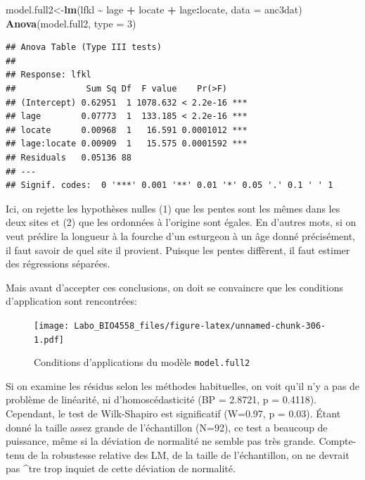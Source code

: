 \documentclass[
  12pt,
]{book}
\newenvironment{Shaded}{\begin{snugshade}}{\end{snugshade}}
\newcommand{\DataTypeTok}[1]{\textcolor[rgb]{0.13,0.29,0.53}{#1}}
\newcommand{\DecValTok}[1]{\textcolor[rgb]{0.00,0.00,0.81}{#1}}
\newcommand{\KeywordTok}[1]{\textcolor[rgb]{0.13,0.29,0.53}{\textbf{#1}}}
\newcommand{\NormalTok}[1]{#1}
\newcommand{\OperatorTok}[1]{\textcolor[rgb]{0.81,0.36,0.00}{\textbf{#1}}}
\newcommand{\StringTok}[1]{\textcolor[rgb]{0.31,0.60,0.02}{#1}}
\begin{document}
\begin{Shaded}
\begin{Highlighting}[]
\NormalTok{model.full2\textless{}{-}}\KeywordTok{lm}\NormalTok{(lfkl }\OperatorTok{\textasciitilde{}}\StringTok{ }\NormalTok{lage }\OperatorTok{+}\StringTok{ }\NormalTok{locate }\OperatorTok{+}\StringTok{ }\NormalTok{lage}\OperatorTok{:}\NormalTok{locate, }\DataTypeTok{data =}\NormalTok{ anc3dat)}
\KeywordTok{Anova}\NormalTok{(model.full2, }\DataTypeTok{type =} \DecValTok{3}\NormalTok{)}
\end{Highlighting}
\end{Shaded}

\begin{verbatim}
## Anova Table (Type III tests)
## 
## Response: lfkl
##              Sum Sq Df  F value    Pr(>F)    
## (Intercept) 0.62951  1 1078.632 < 2.2e-16 ***
## lage        0.07773  1  133.185 < 2.2e-16 ***
## locate      0.00968  1   16.591 0.0001012 ***
## lage:locate 0.00909  1   15.575 0.0001592 ***
## Residuals   0.05136 88                       
## ---
## Signif. codes:  0 '***' 0.001 '**' 0.01 '*' 0.05 '.' 0.1 ' ' 1
\end{verbatim}

Ici, on rejette les hypothèses nulles (1) que les pentes sont les mêmes dans les deux sites et (2) que les ordonnées à l'origine sont égales. En d'autres mots, si on veut prédire la longueur à la fourche d'un esturgeon à un âge donné précisément, il faut savoir de quel site il provient. Puisque les pentes diffèrent, il faut estimer des régressions séparées.

Mais avant d'accepter ces conclusions, on doit se convaincre que les conditions d'application sont rencontrées:

\begin{figure}
\centering
\texttt{[image: Labo\_BIO4558\_files/figure-latex/unnamed-chunk-306-1.pdf]}
\caption{\label{fig:unnamed-chunk-306}Conditions d'applications du modèle \texttt{model.full2}}
\end{figure}

Si on examine les résidus selon les méthodes habituelles, on voit qu'il n'y a pas de problème de linéarité, ni d'homoscédasticité (BP = 2.8721, p = 0.4118). Cependant, le test de Wilk-Shapiro est significatif (W=0.97, p = 0.03). Étant donné la taille assez grande de l'échantillon (N=92), ce test a beaucoup de puissance, même si la déviation de normalité ne semble pas très grande. Compte-tenu de la robustesse relative des LM, de la taille de l'échantillon, on ne devrait pas \^{}tre trop inquiet de cette déviation de normalité.
\end{document}

